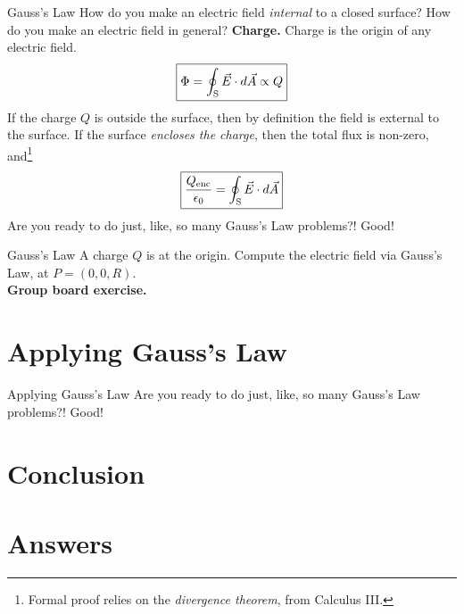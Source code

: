 \documentclass{beamer}
\begin{document}
\begin{frame}{Gauss's Law}
How do you make an electric field \textit{internal} to a closed surface?  How do you make an electric field in general?  \textbf{Charge.}  Charge is the origin of any electric field.
\begin{equation}
\boxed{
\Phi = \oint_{\rm S} \vec{E} \cdot d\vec{A} \propto Q} \label{eq:general2}
\end{equation}
If the charge $Q$ is outside the surface, then by definition the field is external to the surface.  If the surface \textit{encloses the charge}, then the total flux is non-zero, and\footnote{Formal proof relies on the \textit{divergence theorem}, from Calculus III.}
\begin{equation}
\boxed{
\frac{Q_{\rm enc}}{\epsilon_0} = \oint_{\rm S} \vec{E} \cdot d\vec{A}} \label{eq:gauss}
\end{equation}
Are you ready to do just, like, so many Gauss's Law problems?!  Good!
\end{frame}

\begin{frame}{Gauss's Law}
A charge $Q$ is at the origin.  Compute the electric field via Gauss's Law, at $P = (0,0,R)$. \\ \vspace{0.5cm}
\textbf{Group board exercise.}
\end{frame}

\section{Applying Gauss's Law}

\begin{frame}{Applying Gauss's Law}
Are you ready to do just, like, so many Gauss's Law problems?!  Good!
\end{frame}

\section{Conclusion}

\section{Answers}
\end{document}
